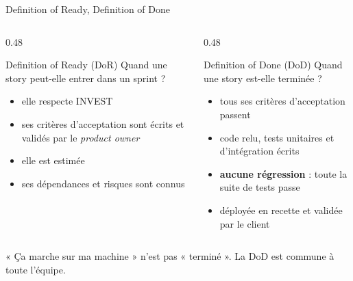 \documentclass[aspectratio=169,10pt]{beamer}
\begin{document}
\begin{frame}{Definition of Ready, Definition of Done}
  \begin{columns}[T]
    \begin{column}{0.48\textwidth}
      \begin{block}{Definition of Ready (DoR)}
        Quand une story peut-elle entrer dans un sprint ?
        \begin{itemize}
          \item elle respecte INVEST
          \item ses critères d'acceptation sont écrits et validés par le \textit{product owner}
          \item elle est estimée
          \item ses dépendances et risques sont connus
        \end{itemize}
      \end{block}
    \end{column}
    \begin{column}{0.48\textwidth}
      \begin{block}{Definition of Done (DoD)}
        Quand une story est-elle terminée ?
        \begin{itemize}
          \item tous ses critères d'acceptation passent
          \item code relu, tests unitaires et d'intégration écrits
          \item \textbf{aucune régression} : toute la suite de tests passe
          \item déployée en recette et validée par le client
        \end{itemize}
      \end{block}
    \end{column}
  \end{columns}
  \vspace{3mm}
  \begin{center}
    « Ça marche sur ma machine » n'est pas « terminé ». La DoD est commune à toute l'équipe.
  \end{center}
\end{frame}
\end{document}

